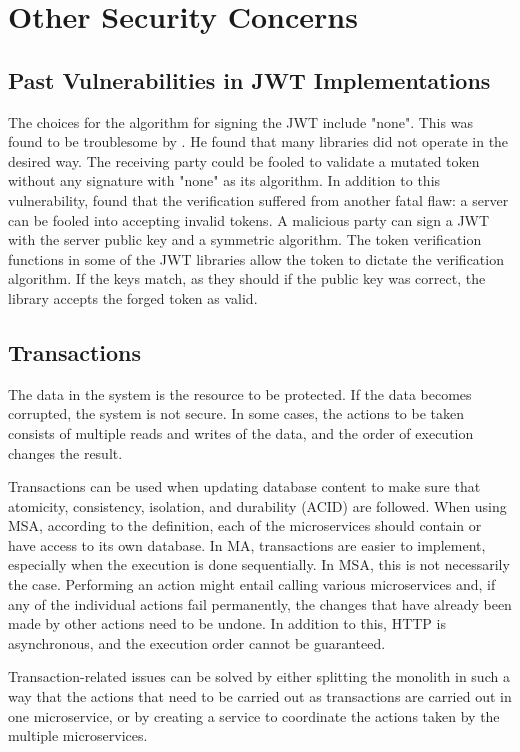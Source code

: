 \section{Other Security Concerns}
\subsection{Past Vulnerabilities in JWT Implementations}
\begin{sloppypar}
    The choices for the algorithm for signing the JWT include "none". This was
    found to be troublesome by \citet{nonejwt}. He found that many libraries did
    not operate in the desired way. The receiving party could be fooled to
    validate a mutated token without any signature with "none" as its algorithm.
    In addition to this vulnerability, \citet{nonejwt} found that the
    verification suffered from another fatal flaw: a server can be fooled into
    accepting invalid tokens. A malicious party can sign a JWT with the server
    public key and a symmetric algorithm. The token verification functions in
    some of the JWT libraries allow the token to dictate the verification
    algorithm. If the keys match, as they should if the public key was correct,
    the library accepts the forged token as valid.
\end{sloppypar}

\subsection{Transactions}
\begin{sloppypar}
    The data in the system is the resource to be protected. If the data becomes
    corrupted, the system is not secure. In some cases, the actions to be taken
    consists of multiple reads and writes of the data, and the order of
    execution changes the result.
\end{sloppypar}
\begin{sloppypar}
    Transactions can be used when updating database content to make sure that
    atomicity, consistency, isolation, and durability (ACID) \citep{acid} are
    followed. When using MSA, according to the definition, each of the
    microservices should contain or have access to its own database.
    In MA, transactions are easier to implement, especially when the execution
    is done sequentially. In MSA, this is not necessarily the case. Performing
    an action might entail calling various microservices and, if any of the
    individual actions fail permanently, the changes that have already been made
    by other actions need to be undone. In addition to this, HTTP is
    asynchronous, and the execution order cannot be guaranteed.
\end{sloppypar}
\begin{sloppypar}
    Transaction-related issues can be solved by either splitting the monolith in
    such a way that the actions that need to be carried out as transactions are
    carried out in one microservice, or by creating a service to coordinate the
    actions taken by the multiple microservices.
\end{sloppypar}

